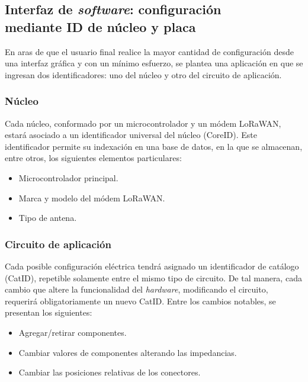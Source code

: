 \subsection[Interfaz de \emph{software}: configuración mediante ID de núcleo y placa]{Interfaz de \emph{software}: configuración\\ mediante ID de núcleo y placa}

En aras de que el usuario final realice la mayor cantidad de configuración desde una interfaz gráfica y con un mínimo esfuerzo, se plantea una aplicación en que se ingresan dos identificadores: uno del núcleo y otro del circuito de aplicación.

\subsubsection{Núcleo}

Cada núcleo, conformado por un microcontrolador y un módem LoRaWAN, estará asociado a un identificador universal del núcleo (CoreID). Este identificador permite su indexación en una base de datos, en la que se almacenan, entre otros, los siguientes elementos particulares:
\begin{itemize}
    \item Microcontrolador principal.
    \item Marca y modelo del módem LoRaWAN.
    \item Tipo de antena.
\end{itemize}

\subsubsection{Circuito de aplicación}

Cada posible configuración eléctrica tendrá asignado un identificador de catálogo (CatID), repetible solamente entre el mismo tipo de circuito. De tal manera, cada cambio que altere la funcionalidad del \emph{hardware}, modificando el circuito, requerirá obligatoriamente un nuevo CatID. Entre los cambios notables, se presentan los siguientes:
\begin{itemize}
    \item Agregar/retirar componentes.
    \item Cambiar valores de componentes alterando las impedancias.
    \item Cambiar las posiciones relativas de los conectores.
\end{itemize}

